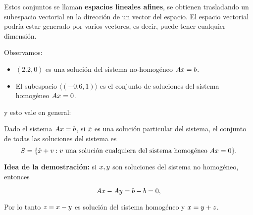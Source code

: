 Estos conjuntos se llaman \textbf{espacios lineales afines}, se obtienen
trasladando un subespacio vectorial en la dirección de un vector del
espacio. El espacio vectorial podría estar generado por varios vectores,
es decir, puede tener cualquier dimensión.

Observamos:

\begin{itemize}
\item   $(2.2, 0)$ es una solución del sistema no-homogéneo $\Ab\xb = \bb$.
\item   El subespacio $\langle (-0.6, 1) \rangle$ es el conjunto de
    soluciones del sistema homogéneo $\Ab\xb = 0$.
\end{itemize}
y esto vale en general:

\begin{prop}
Dado el sistema $\Ab\xb = \bb$, si $\tilde \xb$ es una solución
particular del sistema, el conjunto de todas las soluciones del sistema
es
$$
S = \{\tilde \xb + \vb: \vb \text{ una solución cualquiera del sistema homogéneo } \Ab\xb = 0\}.
$$
\end{prop}

\textbf{Idea de la demostración:} si $\xb, \yb$ son soluciones del sistema no
homogéneo, entonces

$$
\Ab\xb - \Ab\yb = \bb - \bb = 0,
$$

Por lo tanto $\zb = \xb-\yb$ es solución del sistema homogéneo y $\xb = \yb + \zb$.

